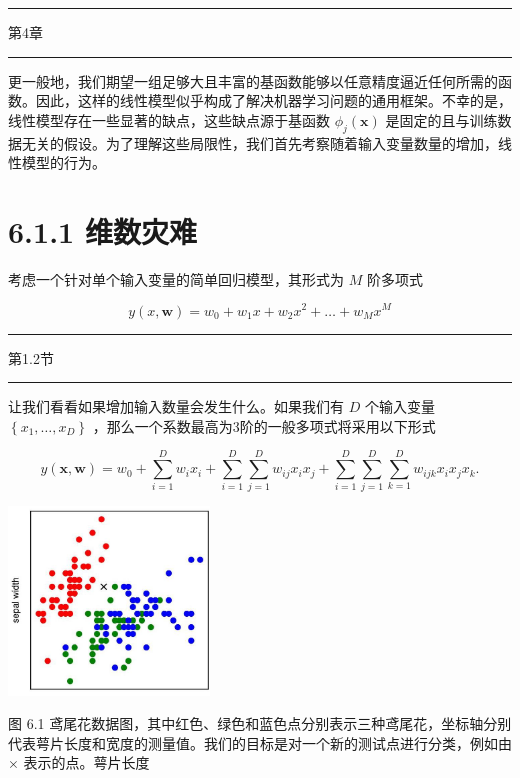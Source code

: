 \documentclass[10pt]{article}
\newcommand{\HRule}{\begin{center}\rule{0.9\linewidth}{0.2mm}\end{center}}
\begin{document}
\HRule

第4章

\HRule

更一般地，我们期望一组足够大且丰富的基函数能够以任意精度逼近任何所需的函数。因此，这样的线性模型似乎构成了解决机器学习问题的通用框架。不幸的是，线性模型存在一些显著的缺点，这些缺点源于基函数 \({\phi }_{j}\left( \mathbf{x}\right)\) 是固定的且与训练数据无关的假设。为了理解这些局限性，我们首先考察随着输入变量数量的增加，线性模型的行为。

\section*{6.1.1 维数灾难}

考虑一个针对单个输入变量的简单回归模型，其形式为 \(M\) 阶多项式

\[
y\left( {x,\mathbf{w}}\right)  = {w}_{0} + {w}_{1}x + {w}_{2}{x}^{2} + \ldots  + {w}_{M}{x}^{M} \tag{6.2}
\]

\HRule

第1.2节

\HRule

让我们看看如果增加输入数量会发生什么。如果我们有 \(D\) 个输入变量 \(\left\{  {{x}_{1},\ldots ,{x}_{D}}\right\}\) ，那么一个系数最高为3阶的一般多项式将采用以下形式

\[
y\left( {\mathbf{x},\mathbf{w}}\right)  = {w}_{0} + \mathop{\sum }\limits_{{i = 1}}^{D}{w}_{i}{x}_{i} + \mathop{\sum }\limits_{{i = 1}}^{D}\mathop{\sum }\limits_{{j = 1}}^{D}{w}_{ij}{x}_{i}{x}_{j} + \mathop{\sum }\limits_{{i = 1}}^{D}\mathop{\sum }\limits_{{j = 1}}^{D}\mathop{\sum }\limits_{{k = 1}}^{D}{w}_{ijk}{x}_{i}{x}_{j}{x}_{k}. \tag{6.3}
\]

\begin{center}
\includegraphics[max width=0.4\textwidth]{images/0194e279-9b28-703a-88f4-c3ac21e2010d_192_946_344_602_565_0.jpg}
\end{center}
\hspace*{3em} 

图 6.1 鸢尾花数据图，其中红色、绿色和蓝色点分别表示三种鸢尾花，坐标轴分别代表萼片长度和宽度的测量值。我们的目标是对一个新的测试点进行分类，例如由 \(\times\) 表示的点。萼片长度
\end{document}
